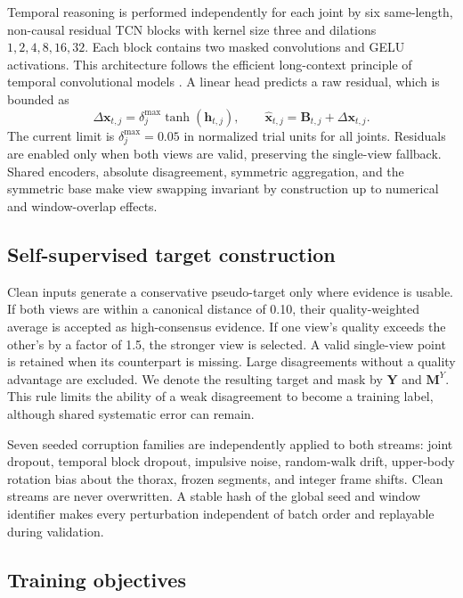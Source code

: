 Temporal reasoning is performed independently for each joint by six
same-length, non-causal residual TCN blocks with kernel size three and dilations
$1,2,4,8,16,32$. Each block contains two masked convolutions and GELU
activations. This architecture follows the efficient long-context principle of
temporal convolutional models \citep{Bai2018TCN,Pavllo2019VideoPose3D}. A linear
head predicts a raw residual, which is bounded as
\begin{equation}
 \Delta\mathbf{x}_{t,j}=\delta^{\max}_{j}
 \tanh(\mathbf{h}_{t,j}),\qquad
 \widehat{\mathbf{x}}_{t,j}=\mathbf{B}_{t,j}+
 \Delta\mathbf{x}_{t,j}.
 \label{eq:residual}
\end{equation}
The current limit is $\delta^{\max}_{j}=0.05$ in normalized trial units for all
joints. Residuals are enabled only when both views are valid, preserving the
single-view fallback. Shared encoders, absolute disagreement, symmetric
aggregation, and the symmetric base make view swapping invariant by
construction up to numerical and window-overlap effects.

\subsection{Self-supervised target construction}

Clean inputs generate a conservative pseudo-target only where evidence is
usable. If both views are within a canonical distance of 0.10, their
quality-weighted average is accepted as high-consensus evidence. If one view's
quality exceeds the other's by a factor of 1.5, the stronger view is selected.
A valid single-view point is retained when its counterpart is missing. Large
disagreements without a quality advantage are excluded. We denote the resulting
target and mask by $\mathbf{Y}$ and $\mathbf{M}^{Y}$. This rule limits the
ability of a weak disagreement to become a training label, although shared
systematic error can remain.

Seven seeded corruption families are independently applied to both streams:
joint dropout, temporal block dropout, impulsive noise, random-walk drift,
upper-body rotation bias about the thorax, frozen segments, and integer frame
shifts. Clean streams are never overwritten. A stable hash of the global seed
and window identifier makes every perturbation independent of batch order and
replayable during validation.

\subsection{Training objectives}

